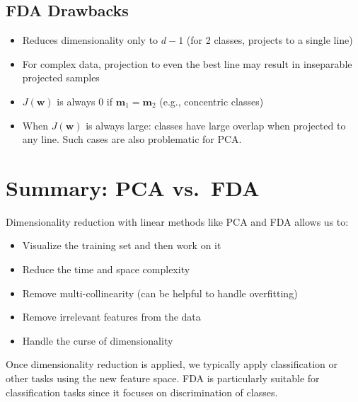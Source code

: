\documentclass[11pt,a4paper]{article}
\theoremstyle{definition}
\theoremstyle{plain}
\theoremstyle{remark}
\begin{document}
\subsection{FDA Drawbacks}

\begin{tcolorbox}[colback=red!5!white,colframe=red!75!black,title=\textbf{FDA Drawbacks}]
\begin{itemize}
    \item Reduces dimensionality only to $d - 1$ (for 2 classes, projects to a single line)
    \item For complex data, projection to even the best line may result in inseparable projected samples
    \item $J(\mathbf{w})$ is always 0 if $\mathbf{m}_1 = \mathbf{m}_2$ (e.g., concentric classes)
    \item When $J(\mathbf{w})$ is always large: classes have large overlap when projected to any line. Such cases are also problematic for PCA.
\end{itemize}
\end{tcolorbox}


\section{Summary: PCA vs.\ FDA}

\begin{tcolorbox}[colback=blue!5!white,colframe=blue!75!black,title=\textbf{Benefits of Dimensionality Reduction}]
Dimensionality reduction with linear methods like PCA and FDA allows us to:
\begin{itemize}
    \item Visualize the training set and then work on it
    \item Reduce the time and space complexity
    \item Remove multi-collinearity (can be helpful to handle overfitting)
    \item Remove irrelevant features from the data
    \item Handle the curse of dimensionality
\end{itemize}
Once dimensionality reduction is applied, we typically apply classification or other tasks using the new feature space. FDA is particularly suitable for classification tasks since it focuses on discrimination of classes.
\end{tcolorbox}
\end{document}
